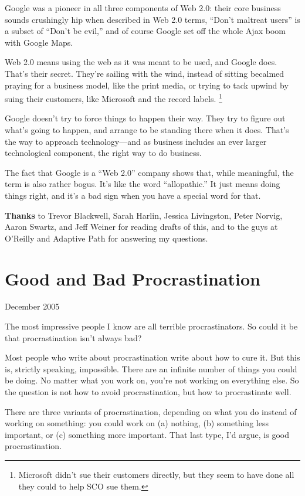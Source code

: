 \documentclass[12pt]{book}
\begin{document}
Google was a pioneer in all three components of Web 2.0: their core
business sounds crushingly hip when described in Web 2.0 terms, ``Don't
maltreat users'' is a subset of ``Don't be evil,'' and of course Google
set off the whole Ajax boom with Google Maps.

Web 2.0 means using the web as it was meant to be used, and Google does.
That's their secret. They're sailing with the wind, instead of sitting
becalmed praying for a business model, like the print media, or trying
to tack upwind by suing their customers, like Microsoft and the record
labels. \footnote{Microsoft didn't sue their customers directly, but they seem to
have done all they could to help SCO sue them.}

Google doesn't try to force things to happen their way. They try to
figure out what's going to happen, and arrange to be standing there when
it does. That's the way to approach technology---and as business
includes an ever larger technological component, the right way to do
business.

The fact that Google is a ``Web 2.0'' company shows that, while
meaningful, the term is also rather bogus. It's like the word
``allopathic.'' It just means doing things right, and it's a bad sign
when you have a special word for that.


\textbf{Thanks} to Trevor Blackwell, Sarah Harlin, Jessica Livingston,
Peter Norvig, Aaron Swartz, and Jeff Weiner for reading drafts of this,
and to the guys at O'Reilly and Adaptive Path for answering my
questions.
\chapter{Good and Bad Procrastination}

December 2005

The most impressive people I know are all terrible procrastinators. So
could it be that procrastination isn't always bad?

Most people who write about procrastination write about how to cure it.
But this is, strictly speaking, impossible. There are an infinite number
of things you could be doing. No matter what you work on, you're not
working on everything else. So the question is not how to avoid
procrastination, but how to procrastinate well.

There are three variants of procrastination, depending on what you do
instead of working on something: you could work on (a) nothing, (b)
something less important, or (c) something more important. That last
type, I'd argue, is good procrastination.
\end{document}
